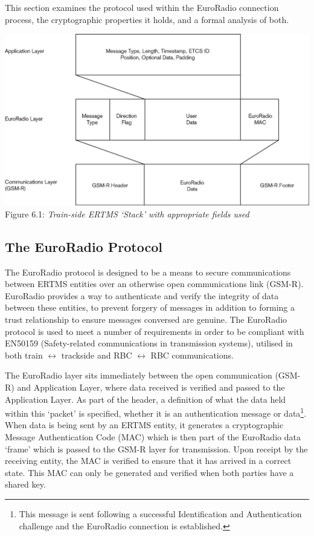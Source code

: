 \documentclass[twoside,11pt,a4paper]{article}
\begin{document}
This section examines the protocol used within the EuroRadio connection process, the cryptographic properties it holds, and a formal analysis of both.
\begin{center}
 \includegraphics[scale=.5]{ERTMSStack.eps}\\
Figure 6.1: \textit{Train-side ERTMS `Stack' with appropriate fields used}
\end{center}

\subsection{The EuroRadio Protocol}
The EuroRadio protocol is designed to be a means to secure communications between ERTMS entities over an otherwise open communications link (GSM-R). EuroRadio provides a way to authenticate and verify the integrity of data between these entities, to prevent forgery of messages in addition to forming a trust relationship to ensure messages conversed are genuine. The EuroRadio protocol is used to meet a number of requirements in order to be compliant with EN50159 (Safety-related communications in transmission systems), utilised in both train $\leftrightarrow$ trackside and RBC $\leftrightarrow$ RBC communications. 

The EuroRadio layer sits immediately between the open communication (GSM-R) and Application Layer, where data received is verified and passed to the Application Layer. As part of the header, a definition of what the data held within this `packet' is specified, whether it is an authentication message or data\footnote{This message is sent following a successful Identification and Authentication challenge and the EuroRadio connection is established.}. When data is being sent by an ERTMS entity, it generates a cryptographic  Message Authentication Code (MAC) which is then part of the EuroRadio data `frame' which is passed to the GSM-R layer for transmission. Upon receipt by the receiving entity, the MAC is verified to ensure that it has arrived in a correct state. This MAC can only be generated and verified when both parties have a shared key.
\end{document}
